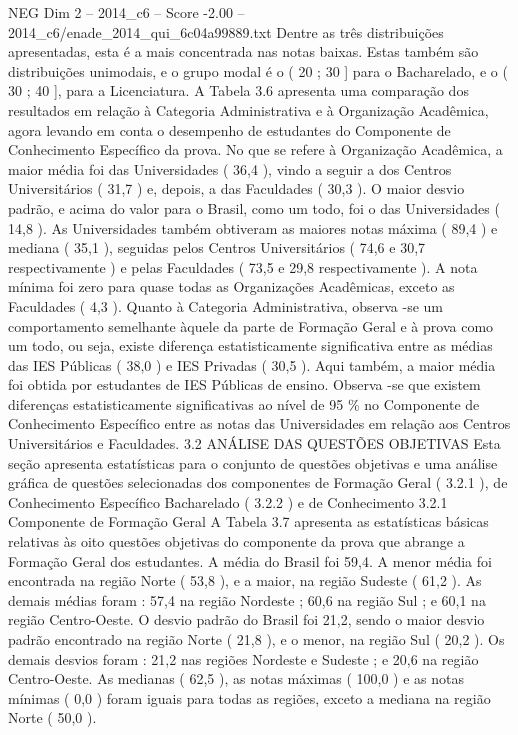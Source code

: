 \begin{textsample}{NEG Dim 2 – 2014\_c6 – Score -2.00 – 2014\_c6/enade\_2014\_qui\_6c04a99889.txt}
Dentre as três distribuições apresentadas, esta é a mais concentrada nas notas baixas.
Estas também são distribuições unimodais, e o grupo modal é o ( 20 ; 30 ] para o Bacharelado, e o ( 30 ; 40 ], para a Licenciatura.
A Tabela 3.6 apresenta uma comparação dos resultados em relação à Categoria Administrativa e à Organização Acadêmica, agora levando em conta o desempenho de estudantes do Componente de Conhecimento Específico da prova.
No que se refere à Organização Acadêmica, a maior média foi das Universidades ( 36,4 ), vindo a seguir a dos Centros Universitários ( 31,7 ) e, depois, a das Faculdades ( 30,3 ).
O maior desvio padrão, e acima do valor para o Brasil, como um todo, foi o das Universidades ( 14,8 ).
As Universidades também obtiveram as maiores notas máxima ( 89,4 ) e mediana ( 35,1 ), seguidas pelos Centros Universitários ( 74,6 e 30,7 respectivamente ) e pelas Faculdades ( 73,5 e 29,8 respectivamente ).
A nota mínima foi zero para quase todas as Organizações Acadêmicas, exceto as Faculdades ( 4,3 ).
Quanto à Categoria Administrativa, observa -se um comportamento semelhante àquele da parte de Formação Geral e à prova como um todo, ou seja, existe diferença estatisticamente significativa entre as médias das IES Públicas ( 38,0 ) e IES Privadas ( 30,5 ).
Aqui também, a maior média foi obtida por estudantes de IES Públicas de ensino.
Observa -se que existem diferenças estatisticamente significativas ao nível de 95 \% no Componente de Conhecimento Específico entre as notas das Universidades em relação aos Centros Universitários e Faculdades. 3.2 ANÁLISE DAS QUESTÕES OBJETIVAS Esta seção apresenta estatísticas para o conjunto de questões objetivas e uma análise gráfica de questões selecionadas dos componentes de Formação Geral ( 3.2.1 ), de Conhecimento Específico Bacharelado ( 3.2.2 ) e de Conhecimento 3.2.1 Componente de Formação Geral A Tabela 3.7 apresenta as estatísticas básicas relativas às oito questões objetivas do componente da prova que abrange a Formação Geral dos estudantes.
A média do Brasil foi 59,4.
A menor média foi encontrada na região Norte ( 53,8 ), e a maior, na região Sudeste ( 61,2 ).
As demais médias foram : 57,4 na região Nordeste ; 60,6 na região Sul ; e 60,1 na região Centro-Oeste.
O desvio padrão do Brasil foi 21,2, sendo o maior desvio padrão encontrado na região Norte ( 21,8 ), e o menor, na região Sul ( 20,2 ).
Os demais desvios foram : 21,2 nas regiões Nordeste e Sudeste ; e 20,6 na região Centro-Oeste.
As medianas ( 62,5 ), as notas máximas ( 100,0 ) e as notas mínimas ( 0,0 ) foram iguais para todas as regiões, exceto a mediana na região Norte ( 50,0 ).

\end{textsample}
